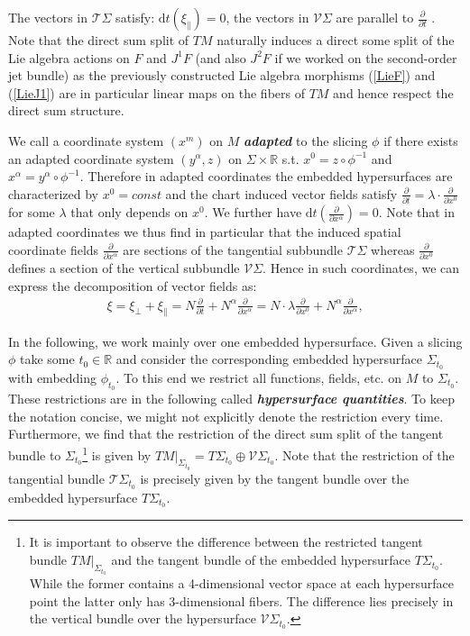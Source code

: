 The vectors in $\mathcal{T}\Sigma$ satisfy: $\mathrm{d}t(\xi_{\parallel})=0$, the vectors in $\mathcal{V}\Sigma$ are parallel to $\frac{\partial}{\partial t}$  . Note that the direct sum split of $TM$ naturally induces a direct some split of the Lie algebra actions on $F$ and $J^1F$ (and also $J^2F$ if we worked on the second-order jet bundle) as the previously constructed Lie algebra morphisms (\ref{LieF}) and (\ref{LieJ1}) are in particular linear maps on the fibers of $TM$ and hence respect the direct sum structure.

We call a coordinate system $(x^m)$ on $M$ \textit{\textbf{adapted}} to the slicing $\phi$ if there exists an adapted coordinate system $(y^{\alpha},z)$ on $\Sigma \times \mathbb{R}$ s.t. $x^0 = z \circ \phi^{-1}$ and $x^{\alpha} = y^{\alpha} \circ \phi^{-1}$. Therefore in adapted coordinates the embedded hypersurfaces are characterized by $x^0 = const$ and the chart induced vector fields satisfy $\frac{\partial}{\partial t} = \lambda \cdot \frac{\partial}{\partial x^0}$ for some $\lambda$ that only depends on $x^0$. We further have $\mathrm{d}t\left(\frac{\partial}{\partial x^{\alpha}}\right) = 0$.
Note that in adapted coordinates we thus find in particular that the induced spatial coordinate fields $\frac{\partial}{\partial x^{\alpha}}$ are sections of the tangential subbundle $\mathcal{T}\Sigma$ whereas $\frac{\partial}{\partial x^0}$ defines a section of the vertical subbundle $\mathcal{V}\Sigma$. Hence in such coordinates, we can express the decomposition of vector fields as: 
\begin{align}
    \xi = \xi_{\perp} + \xi_{\parallel} = N  \frac{\partial }{\partial t} + N^{\alpha} \frac{\partial}{\partial x^{\alpha}} = N \cdot \lambda \frac{\partial}{\partial x^0} + N^{\alpha} \frac{\partial}{\partial x^{\alpha}},
\end{align}

In the following, we work mainly over one embedded hypersurface. Given a slicing $\phi$ take some $t_0 \in \mathbb{R}$ and consider the corresponding embedded hypersurface $\Sigma_{t_0}$ with embedding $\phi_{t_0}$. To this end we restrict all functions, fields, etc. on $M$ to $\Sigma_{t_0}$. These restrictions are in the following called \textbf{\textit{hypersurface quantities}}. To keep the notation concise, we might not explicitly denote the restriction every time. 
Furthermore, we find that the restriction of the direct sum split of the tangent bundle to $\Sigma_{t_0}$\footnote{It is important to observe the difference between the restricted tangent bundle $TM\vert_{\Sigma_{t_0}}$ and the tangent bundle of the embedded hypersurface $T\Sigma_{t_0}$. While the former contains a 4-dimensional vector space at each hypersurface point the latter only has 3-dimensional fibers. The difference lies precisely in the vertical bundle over the hypersurface $\mathcal{V}\Sigma_{t_0}$.} is given by $TM \vert _{\Sigma_{t_0}} = T\Sigma _{t_0} \oplus \mathcal{V}\Sigma _{t_0}$. Note that the restriction of the tangential bundle $\mathcal{T}\Sigma_{t_0}$ is precisely given by the tangent bundle over the embedded hypersurface $T\Sigma_{t_0}$.

